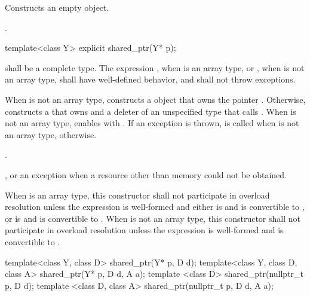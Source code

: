 \begin{itemdescr}
\pnum\effects  Constructs an empty  object.

\pnum\postconditions  {}.
\end{itemdescr}

%
\begin{itemdecl}
template<class Y> explicit shared_ptr(Y* p);
\end{itemdecl}

\begin{itemdescr}
\pnum\requires {} shall be a complete type. The expression
, when  is an array type, or
, when  is not an array type,
shall have well-defined behavior, and
shall not throw exceptions.

\pnum\effects When  is not an array type,
constructs a  object
that owns the pointer .
Otherwise, constructs a 
that owns  and a deleter of an
unspecified type that calls .
When  is not an array type,
enables  with .
If an exception is thrown,  is called
when  is not an array type,  otherwise.

\pnum\postconditions  {}.

\pnum\throws {}, or an  exception when a resource other than memory could not be obtained.

\pnum\remarks When  is an array type,
this constructor shall not participate in overload resolution unless
the expression  is well-formed and either
 is  and  is convertible to , or
 is  and  is convertible to .
When  is not an array type,
this constructor shall not participate in overload resolution unless
the expression  is well-formed and
 is convertible to .
\end{itemdescr}

%
\begin{itemdecl}
template<class Y, class D> shared_ptr(Y* p, D d);
template<class Y, class D, class A> shared_ptr(Y* p, D d, A a);
template <class D> shared_ptr(nullptr_t p, D d);
template <class D, class A> shared_ptr(nullptr_t p, D d, A a);
\end{itemdecl}

